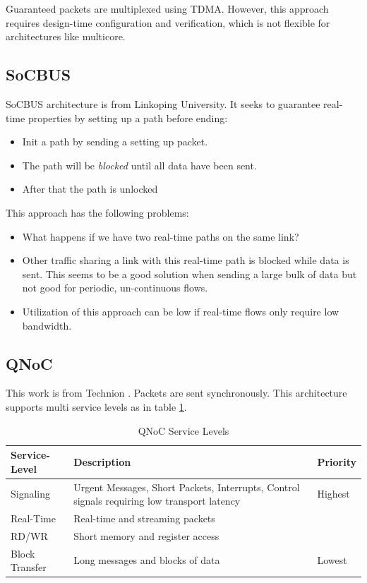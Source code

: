 \documentclass[a4]{article}
\begin{document}
Guaranteed packets are multiplexed using TDMA. However, this approach requires
design-time configuration and verification, which is not flexible for architectures
like multicore.
\subsection{SoCBUS}
SoCBUS architecture \cite{SoCBUS} is from Linkoping University. It seeks to 
guarantee real-time properties by setting up a path before ending:
\begin{itemize}
\item Init a path by sending a setting up packet.
\item The path will be {\em blocked} until all data have been sent.
\item After that the path is unlocked
\end{itemize}
This approach has the following problems: 
\begin{itemize}
\item What happens if we have two real-time paths on the same link?
\item Other traffic sharing a link with this real-time path is blocked while 
data is sent. This seems to be a good solution when sending a large bulk of data 
but not good for periodic, un-continuous flows.
\item Utilization of this approach can be low if real-time flows only require
low bandwidth.
\end{itemize}
\subsection{QNoC}
This work is from Technion \cite{QNoC}. Packets are sent synchronously. 
This architecture supports multi service levels as in table \ref{table:QNoCTable}.

\begin{table}[htbp]
\begin{center}
  \begin{tabular}{ | p{2.5cm} | p{6cm} | p{2cm} |}
    \hline
	Service-Level & Description & Priority \\ \hline
	Signaling & Urgent Messages, Short Packets, Interrupts, Control signals 
	requiring low transport latency & Highest \\ \hline
	Real-Time & Real-time and streaming packets & \\ \hline
	RD/WR & Short memory and register access & \\ \hline
	Block Transfer & Long messages and blocks of data & Lowest \\
    \hline
  \end{tabular}
\end{center}
\caption{QNoC Service Levels}
\label{table:QNoCTable}
\end{table}
\end{document}
